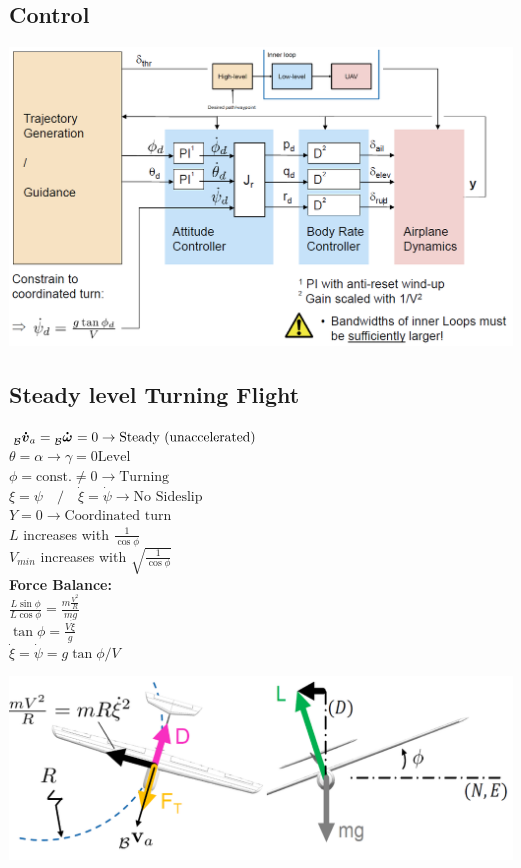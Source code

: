 \documentclass[a4paper, 8pt]{extarticle}
\newcommand{\mvec}[3]{  \prescript{}{\mathcal{#1}}{\bm{#2}}  _{#3} }
\begin{document}
\begin{multicols*}{3}
\subsection{Control}
\includegraphics[width=1\linewidth]{images/FW_ControlLoop.png}\\


\subsection{Steady level Turning Flight}
$\mvec{\mathcal{B}}{\dot{v}}{a}=\mvec{\mathcal{B}}{\dot{\omega}}{}=0 \rightarrow \textrm{Steady (unaccelerated)}$ \\
$\theta=\alpha \rightarrow \gamma =0 \textrm{Level}$\\
$\phi=\textrm{const.}\neq 0 \rightarrow \textrm{Turning}$\\
$\xi=\psi \quad \textrm{/} \quad \dot{\xi}=\dot{\psi} \rightarrow \textrm{No Sideslip}$\\
$Y=0 \rightarrow \textrm{Coordinated turn}$\\
$L$ increases with $\frac{1}{\cos{\phi}}$\\
$V_{min}$ increases with $\sqrt{\frac{1}{\cos{\phi}}}$\\
\textbf{Force Balance:}\\
$\frac{L \sin{\phi}}{L \cos{\phi}}=\frac{m\frac{V^2}{R}}{mg}$\\
$\tan{\phi}=\frac{V\dot{\xi}}{g}$\\
$\dot{\xi}=\dot{\psi}=g\tan{\phi}/V$\\

\begin{center}
    
\includegraphics[width=0.85\linewidth]{images/Coordinated_Turn.PNG}\\
\end{center}


\end{multicols*}
\end{document}
